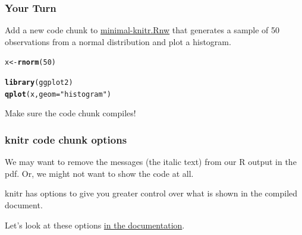 \documentclass{beamer}\usepackage[]{graphicx}\usepackage[]{color}
\makeatletter
\newcommand{\hlnum}[1]{\textcolor[rgb]{0.686,0.059,0.569}{#1}}%
\newcommand{\hlstr}[1]{\textcolor[rgb]{0.192,0.494,0.8}{#1}}%
\newcommand{\hlstd}[1]{\textcolor[rgb]{0.345,0.345,0.345}{#1}}%
\newcommand{\hlkwb}[1]{\textcolor[rgb]{0.69,0.353,0.396}{#1}}%
\newcommand{\hlkwc}[1]{\textcolor[rgb]{0.333,0.667,0.333}{#1}}%
\newcommand{\hlkwd}[1]{\textcolor[rgb]{0.737,0.353,0.396}{\textbf{#1}}}%
\newenvironment{kframe}{%
 \def\at@end@of@kframe{}%
 \ifinner\ifhmode%
  \def\at@end@of@kframe{\end{minipage}}%
  \begin{minipage}{\columnwidth}%
 \fi\fi%
 \def\FrameCommand##1{\hskip\@totalleftmargin \hskip-\fboxsep
 \colorbox{shadecolor}{##1}\hskip-\fboxsep
     \hskip-\linewidth \hskip-\@totalleftmargin \hskip\columnwidth}%
 \MakeFramed {\advance\hsize-\width
   \@totalleftmargin\z@ \linewidth\hsize
   \@setminipage}}%
 {\par\unskip\endMakeFramed%
 \at@end@of@kframe}
\newenvironment{knitrout}{}{} %
\makeatother
\begin{document}

\begin{frame}[fragile]
\frametitle{Your Turn}
Add a new code chunk to \href{../code/minimal-knitr.Rnw}{minimal-knitr.Rnw} that generates a sample of 50 observations from a normal distribution and plot a histogram. 

\begin{knitrout}\footnotesize
{}\color{fgcolor}\begin{kframe}
\begin{alltt}
\hlstd{x} \hlkwb{<-} \hlkwd{rnorm}\hlstd{(}\hlnum{50}\hlstd{)}

\hlkwd{library}\hlstd{(ggplot2)}
\hlkwd{qplot}\hlstd{(x,} \hlkwc{geom}\hlstd{=}\hlstr{"histogram"}\hlstd{)}
\end{alltt}
\end{kframe}
\end{knitrout}


Make sure the code chunk compiles!
\end{frame}


\begin{frame}
\frametitle{knitr code chunk options}
We may want to remove the messages (the italic text) from our R output in the pdf. Or, we might not want to show the code at all. \bigskip\bigskip

knitr has options to give you greater control over what is shown in the compiled document. \bigskip\bigskip

Let's look at these options \href{http://yihui.name/knitr/options}{in the documentation}.
\end{frame}

\end{document}
